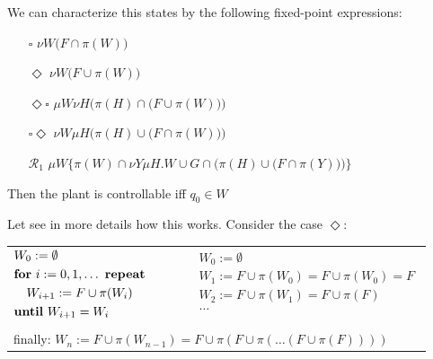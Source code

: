 \documentclass[table]{beamer}
\begin{document}
\begin{frame}
	We can characterize this states by the following fixed-point expressions:
	\begin{itemize}
		\item[$\square$] $\nu W \big( F \cap \pi(W)\big)$ 
		\item[$\Diamond$] $\nu W\big(F \cup \pi(W)\big)$ 
		\item[$\Diamond\square$] $\mu W \nu H\Big(\pi(H) \cap \big(F \cup \pi(W)\big)\Big)$
		\item[$\square\Diamond$] $\nu W \mu H\Big(\pi(H) \cup \big(F \cap \pi(W)\big)\Big)$
		\item[$\mathcal{R}_1$] $\mu W \Bigg\{\pi(W) \cap \nu Y \mu H . W \cup G \cap \Big(\pi(H) \cup \big(F \cap \pi(Y)\big)\Big)\Bigg\}$
	\end{itemize}
	Then the plant is controllable iff $q_0 \in W$
\end{frame}

\begin{frame}
	Let see in more details how this works. Consider the case $\Diamond$:
	\begin{table}[]
		\begin{tabular}{lll}
		$\begin{aligned}
			&W_0 := \emptyset \\
			&\textrm{\textbf{for} } i:=0,1,\ldots \textrm{ \textbf{repeat}} \\
			& \quad W_{i+1} := F \cup \pi(W_i) \\
			&\textrm{\textbf{until} } W_{i+1} = W_i\\
		\end{aligned}$
		& $\quad$ &
		$\begin{aligned}
			&W_0 := \emptyset \\
			&W_1 := F \cup \pi(W_0) = F \cup \pi(W_0) = F \\
			&W_2 := F \cup \pi(W_1) = F \cup \pi(F)\\
			& \ldots \\
		\end{aligned}$ \\
		&&\\%
		\multicolumn{3}{l}{finally: $W_n := F \cup \pi(W_{n-1}) = F \cup \pi(F \cup \pi(\ldots(F \cup \pi(F))))$}
		\end{tabular}
	\end{table}
\end{frame}
\end{document}
